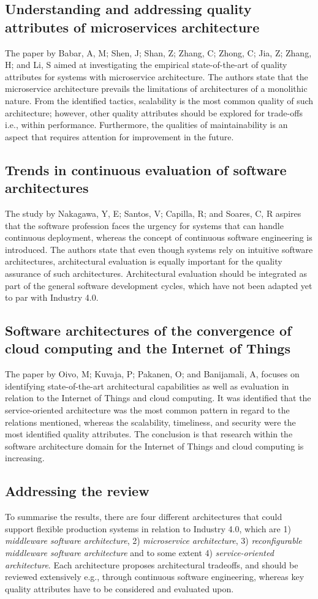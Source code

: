 \subsection{Understanding and addressing quality attributes of microservices architecture}
The paper by Babar, A, M; Shen, J; Shan, Z; Zhang, C; Zhong, C; Jia, Z; Zhang, H; and Li, S aimed at investigating the empirical state-of-the-art of quality attributes for systems with microservice architecture. The authors state that the microservice architecture prevails the limitations of architectures of a monolithic nature. From the identified tactics, scalability is the most common quality of such architecture; however, other quality attributes should be explored for trade-offs i.e., within performance. Furthermore, the qualities of maintainability is an aspect that requires attention for improvement in the future\cite{Li2021}.
\subsection{Trends in continuous evaluation of software architectures}
The study by Nakagawa, Y, E; Santos, V; Capilla, R; and Soares, C,  R aspires that the software profession faces the urgency for systems that can handle continuous deployment, whereas the concept of continuous software engineering is introduced. The authors state that even though systems rely on intuitive software architectures, architectural evaluation is equally important for the quality assurance of such architectures. Architectural evaluation should be integrated as part of the general software development cycles, which have not been adapted yet to par with Industry 4.0\cite{Soares20231957}.
\subsection{Software architectures of the convergence of cloud computing and the Internet of Things}
The paper by Oivo, M; Kuvaja, P; Pakanen, O; and Banijamali, A, focuses on identifying state-of-the-art architectural capabilities as well as evaluation in relation to the Internet of Things and cloud computing. It was identified that the service-oriented architecture was the most common pattern in regard to the relations mentioned, whereas the scalability, timeliness, and security were the most identified quality attributes. The conclusion is that research within the software architecture domain for the Internet of Things and cloud computing is increasing\cite{Banijamali2020}. 
\subsection{Addressing the review}
To summarise the results, there are four different architectures that could support flexible production systems in relation to Industry 4.0, which are 1) \textit{middleware software architecture}, 2)  \textit{microservice architecture},  3) \textit{reconfigurable middleware software architecture} and to some extent 4) \textit{service-oriented architecture}. Each architecture proposes architectural tradeoffs, and should be reviewed extensively e.g., through continuous software engineering, whereas key quality attributes have to be considered and evaluated upon.